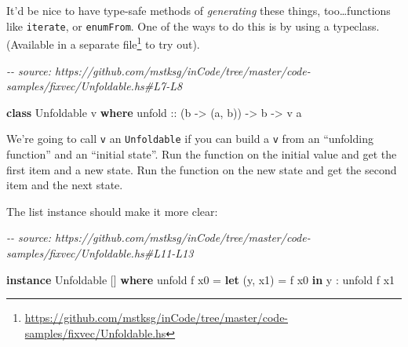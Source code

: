 \documentclass[]{article}
\newenvironment{Shaded}{}{}
\newcommand{\CommentTok}[1]{\textcolor[rgb]{0.38,0.63,0.69}{\textit{#1}}}
\newcommand{\DataTypeTok}[1]{\textcolor[rgb]{0.56,0.13,0.00}{#1}}
\newcommand{\DecValTok}[1]{\textcolor[rgb]{0.25,0.63,0.44}{#1}}
\newcommand{\FunctionTok}[1]{\textcolor[rgb]{0.02,0.16,0.49}{#1}}
\newcommand{\KeywordTok}[1]{\textcolor[rgb]{0.00,0.44,0.13}{\textbf{#1}}}
\newcommand{\NormalTok}[1]{#1}
\newcommand{\OperatorTok}[1]{\textcolor[rgb]{0.40,0.40,0.40}{#1}}
\newcommand{\OtherTok}[1]{\textcolor[rgb]{0.00,0.44,0.13}{#1}}
\renewcommand{\href}[2]{#2\footnote{\url{#1}}}
\begin{document}
It'd be nice to have type-safe methods of \emph{generating} these things,
too\ldots functions like \texttt{iterate}, or \texttt{enumFrom}. One of the ways
to do this is by using a typeclass. (Available in a
\href{https://github.com/mstksg/inCode/tree/master/code-samples/fixvec/Unfoldable.hs}{separate
file} to try out).

\begin{Shaded}
\begin{Highlighting}[]
\CommentTok{{-}{-} source: https://github.com/mstksg/inCode/tree/master/code{-}samples/fixvec/Unfoldable.hs\#L7{-}L8}

\KeywordTok{class} \DataTypeTok{Unfoldable}\NormalTok{ v }\KeywordTok{where}
\OtherTok{    unfold ::}\NormalTok{ (b }\OtherTok{{-}>}\NormalTok{ (a, b)) }\OtherTok{{-}>}\NormalTok{ b }\OtherTok{{-}>}\NormalTok{ v a}
\end{Highlighting}
\end{Shaded}

We're going to call \texttt{v} an \texttt{Unfoldable} if you can build a
\texttt{v} from an ``unfolding function'' and an ``initial state''. Run the
function on the initial value and get the first item and a new state. Run the
function on the new state and get the second item and the next state.

The list instance should make it more clear:

\begin{Shaded}
\begin{Highlighting}[]
\CommentTok{{-}{-} source: https://github.com/mstksg/inCode/tree/master/code{-}samples/fixvec/Unfoldable.hs\#L11{-}L13}

\KeywordTok{instance} \DataTypeTok{Unfoldable}\NormalTok{ [] }\KeywordTok{where}
\NormalTok{    unfold f x0 }\OtherTok{=} \KeywordTok{let}\NormalTok{ (y, x1) }\OtherTok{=}\NormalTok{ f x0}
                  \KeywordTok{in}\NormalTok{  y }\OperatorTok{:}\NormalTok{ unfold f x1}
\end{Highlighting}
\end{Shaded}

\begin{Shaded}
\end{Shaded}
\end{document}
